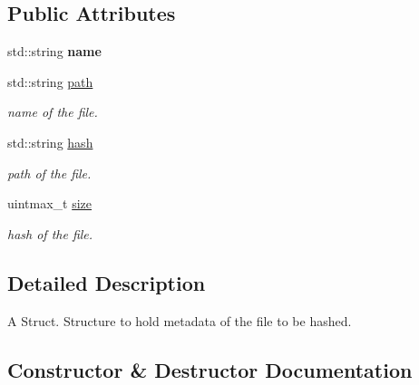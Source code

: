 \subsection*{Public Attributes}
\begin{DoxyCompactItemize}
\item 
std\+::string {\bfseries name}\hypertarget{structdfr_1_1file__data_a9dd5c141e4c286b7443a1c08e656999f}{}\label{structdfr_1_1file__data_a9dd5c141e4c286b7443a1c08e656999f}

\item 
std\+::string \hyperlink{structdfr_1_1file__data_a49e1a762af0cfc8dd25669a1c17340da}{path}\hypertarget{structdfr_1_1file__data_a49e1a762af0cfc8dd25669a1c17340da}{}\label{structdfr_1_1file__data_a49e1a762af0cfc8dd25669a1c17340da}

\begin{DoxyCompactList}\small\item\em name of the file. \end{DoxyCompactList}\item 
std\+::string \hyperlink{structdfr_1_1file__data_aa8a72424cf90ec52065aff6116f0be41}{hash}\hypertarget{structdfr_1_1file__data_aa8a72424cf90ec52065aff6116f0be41}{}\label{structdfr_1_1file__data_aa8a72424cf90ec52065aff6116f0be41}

\begin{DoxyCompactList}\small\item\em path of the file. \end{DoxyCompactList}\item 
uintmax\+\_\+t \hyperlink{structdfr_1_1file__data_a4fbf33ba9872a4fc575ef911e5a8f80c}{size}\hypertarget{structdfr_1_1file__data_a4fbf33ba9872a4fc575ef911e5a8f80c}{}\label{structdfr_1_1file__data_a4fbf33ba9872a4fc575ef911e5a8f80c}

\begin{DoxyCompactList}\small\item\em hash of the file. \end{DoxyCompactList}\end{DoxyCompactItemize}


\subsection{Detailed Description}
A Struct. Structure to hold metadata of the file to be hashed. 

\subsection{Constructor \& Destructor Documentation}
